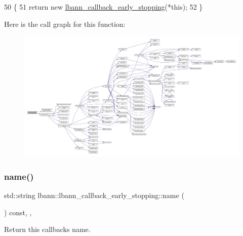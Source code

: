 \begin{DoxyCode}
50                                                        \{
51     \textcolor{keywordflow}{return} \textcolor{keyword}{new} \hyperlink{classlbann_1_1lbann__callback__early__stopping_ac0140e05eccd5280d53a8e8d480c0ce3}{lbann\_callback\_early\_stopping}(*\textcolor{keyword}{this});
52   \}
\end{DoxyCode}
Here is the call graph for this function\+:\nopagebreak
\begin{figure}[H]
\begin{center}
\leavevmode
\includegraphics[width=350pt]{classlbann_1_1lbann__callback__early__stopping_aa8e7bd4e9dde8e57dbc416dc75e25cc6_cgraph}
\end{center}
\end{figure}
\mbox{\label{classlbann_1_1lbann__callback__early__stopping_a3fce0ab7696bc24dd9b3330815c5a495}} 
\subsubsection{\texorpdfstring{name()}{name()}}
{\footnotesize\ttfamily std\+::string lbann\+::lbann\+\_\+callback\+\_\+early\+\_\+stopping\+::name (\begin{DoxyParamCaption}{ }\end{DoxyParamCaption}) const\hspace{0.3cm}{\ttfamily [inline]}, {\ttfamily [override]}, {\ttfamily [virtual]}}

Return this callback\textquotesingle{}s name. 

